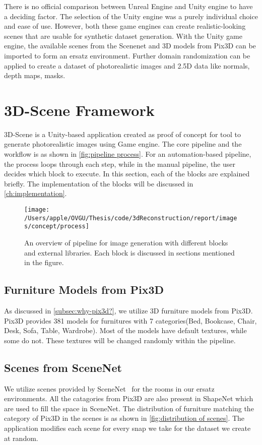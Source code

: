 There is no official comparison between Unreal Engine and Unity engine to have a deciding factor.
The selection of the Unity engine was a purely individual choice and ease of use.
However, both these game engines can create realistic-looking scenes that are usable for synthetic dataset generation.
With the Unity game engine, the available scenes from the Scenenet and 3D models from Pix3D can be imported to form an ersatz environment.
Further domain randomization can be applied to create a dataset of photorealistic images and 2.5D data like normals, depth maps, masks.


\section{3D-Scene Framework}\label{sec:3d-scene-framework}
3D-Scene is a Unity-based application created as proof of concept for tool to generate photorealistic images using Game engine.
The core pipeline and the workflow is as shown in \autoref{fig:pipeline process}.
For an automation-based pipeline, the process loops through each step, while in the manual pipeline, the user decides which block to execute.
In this section, each of the blocks are explained briefly.
The implementation of the blocks will be discussed in \autoref{ch:implementation}.

\begin{figure}[!ht]
    \centering
    \texttt{[image: /Users/apple/OVGU/Thesis/code/3dReconstruction/report/images/concept/process]}
    \caption[Overview of 3D-Scene Tool]{An overview of pipeline for image generation with different blocks and external libraries.
    Each block is discussed in sections mentioned in the figure.}
    \label{fig:pipeline process}
\end{figure}

\subsection{Furniture Models from Pix3D}\label{subsec:furniture-models-from-pix3d}
As discussed in \autoref{subsec:why-pix3d?}, we utilize 3D furniture models from Pix3D.
Pix3D provides 381 models for furnitures with 7 categories(Bed, Bookcase, Chair, Desk, Sofa, Table, Wardrobe).
Most of the models have default textures, while some do not.
These textures will be changed randomly within the pipeline.

\subsection{Scenes from SceneNet}\label{subsec:scenes-from-scenenet}
We utilize scenes provided by SceneNet~\cite{McCormac2017} for the rooms in our ersatz environments.
All the catagories from Pix3D are also present in ShapeNet which are used to fill the space in SceneNet.
The distribution of furniture matching the category of Pix3D in the scenes is as shown in \autoref{fig:distribution of scenes}.
The application modifies each scene for every snap we take for the dataset we create at random.

